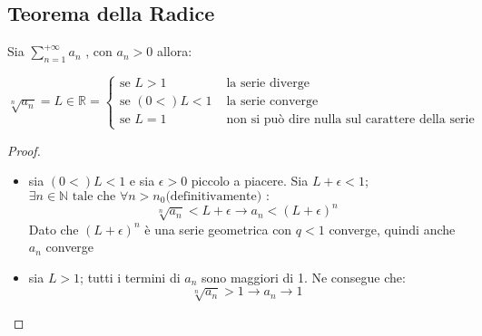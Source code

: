 \documentclass[a4paper,12pt, oneside]{book}
\begin{document}
\subsection{Teorema della Radice}
\begin{teorema} Sia $\sum_{n=1}^{+\infty} a_n$ , con
  $a_n>0$ allora:
  \begin{center} $\sqrt[n]{a_n}=L\in \mathbb{R}=\left\{
      \begin{array}{ll} \mbox{se } L>1 & \mbox{ la serie diverge} \\ \mbox{se }
        (0<)L<1 & \mbox{ la serie converge} \\ \mbox{se } L=1 & \mbox{ non si può dire
                                                                nulla sul carattere della serie}
      \end{array} \right.$
  \end{center}
\end{teorema}
\begin{proof}
  \begin{itemize}
    \item sia $(0<)L<1$ e sia $\epsilon >0$ piccolo a piacere. Sia
    $L+\epsilon<1$; $\exists n\in\mathbb{N} \mbox{ tale che } \forall n>n_0\mbox{
      (definitivamente) }:$
    $$\sqrt[n]{a_n}<L+\epsilon \longrightarrow a_n<{(L+\epsilon)}^{n}$$
    Dato che ${(L+\epsilon)}^{n}$ è una serie geometrica con $q<1$ converge,
    quindi anche $a_n$ converge
    \item sia $L>1$; tutti i termini di $a_n$ sono maggiori di 1. Ne consegue
    che:
    $$\sqrt[n]{a_n}>1 \longrightarrow a_n\rightarrow 1$$
  \end{itemize}
\end{proof}
\newpage
\end{document}
